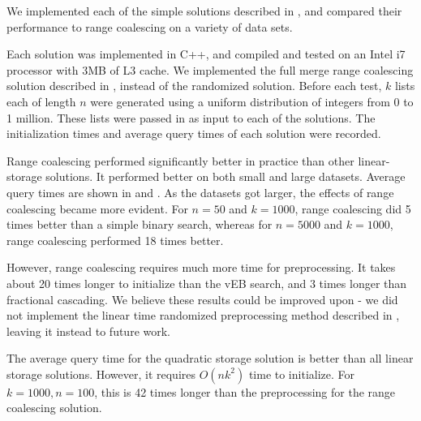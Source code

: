 We implemented each of the simple solutions described in 
, and compared their performance to range coalescing on a variety 
of data sets. 

Each solution was implemented in C++, and compiled and tested on an Intel i7 
processor with 3MB of L3 cache. We implemented the full merge range coalescing 
solution described in , 
instead of the randomized solution. Before each test, $k$ lists each of 
length $n$ were generated using a uniform distribution of integers from 0 to 1 million. 
These lists were passed in as input to each of the solutions.  The initialization 
times and average query times of each solution were recorded. 

Range coalescing performed significantly better in practice than other 
linear-storage solutions. It performed better on both small and large datasets. 
Average query times are shown in  and .
As the datasets got larger, the effects of range coalescing became more evident. 
For $n=50$ and $k=1000$, range coalescing did 5 times better than a simple binary search,
whereas for $n=5000$ and $k=1000$, range coalescing performed 18 times better.

However, range coalescing requires much more time for preprocessing. 
It takes about 20 times longer to initialize than the vEB search, and 3 times longer
than fractional cascading. We believe these results could be improved upon - we 
did not implement the linear time randomized preprocessing method described in
, leaving it instead to future work.

The average query time for the quadratic storage solution is better than all 
linear storage solutions. However, it requires $O(nk^2)$ time to initialize. 
For $k=1000,n=100$, this is 42 times longer than the preprocessing for the 
range coalescing solution.


